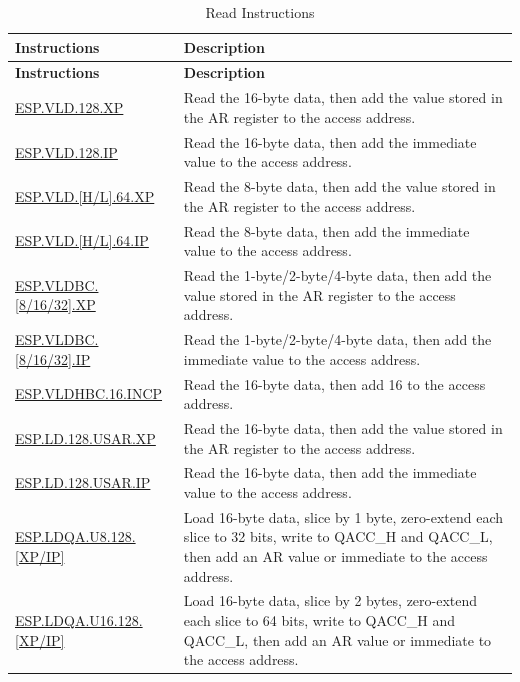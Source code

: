 \begin{longtable}[c]{|l|m{12cm}|}
    \caption{Read Instructions}
    \label{tab:pie-load-instructions}\\
    \hline
    \rowcolor{lightgray}
    \textbf{Instructions} & \textbf{Description} \\\hline
    \endfirsthead
    \rowcolor{lightgray}
    \textbf{Instructions} & \textbf{Description} \\\hline
    \endhead
    \endfoot
    
    \hyperref[instruction:ESPVLD128XP]{ESP.VLD.128.XP} & Read the 16-byte data, then add the value stored in the AR register to the access address.
    \\\hline
    \hyperref[instruction:ESPVLD128IP]{ESP.VLD.128.IP} & Read the 16-byte data, then add the immediate value to the access address.
    \\\hline
    \hyperref[instruction:ESPVLDH64XP]{ESP.VLD.[H/L].64.XP} & Read the 8-byte data, then add the value stored in the AR register to the access address.
    \\\hline
    \hyperref[instruction:ESPVLDH64IP]{ESP.VLD.[H/L].64.IP} & Read the 8-byte data, then add the immediate value to the access address.
    \\\hline
    \hyperref[instruction:ESPVLDBC8XP]{ESP.VLDBC.[8/16/32].XP} & Read the 1-byte/2-byte/4-byte data, then add the value stored in the AR register to the access address.
    \\\hline
    \hyperref[instruction:ESPVLDBC8IP]{ESP.VLDBC.[8/16/32].IP} & Read the 1-byte/2-byte/4-byte data, then add the immediate value to the access address.
    \\\hline
    \hyperref[instruction:ESPVLDHBC16INCP]{ESP.VLDHBC.16.INCP} & Read the 16-byte data, then add 16 to the access address.
    \\\hline
    \hyperref[instruction:ESPLD128USARXP]{ESP.LD.128.USAR.XP} & Read the 16-byte data, then add the value stored in the AR register to the access address.
    \\\hline
    \hyperref[instruction:ESPLD128USARIP]{ESP.LD.128.USAR.IP} & Read the 16-byte data, then add the immediate value to the access address.
    \\\hline
    \hyperref[instruction:ESPLDQAU8128XP]{ESP.LDQA.U8.128.[XP/IP]} & Load 16-byte data, slice by 1 byte, zero-extend each slice to 32 bits, write to QACC\_H and QACC\_L, then add an AR value or immediate to the access address.
    \\\hline
    \hyperref[instruction:ESPLDQAU16128XP]{ESP.LDQA.U16.128.[XP/IP]} & Load 16-byte data, slice by 2 bytes, zero-extend each slice to 64 bits, write to QACC\_H and QACC\_L, then add an AR value or immediate to the access address.

\end{longtable}
